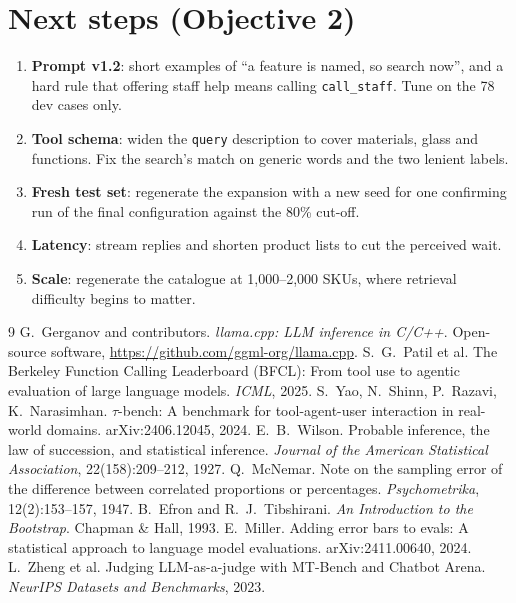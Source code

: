 \documentclass[11pt,a4paper]{article}
\begin{document}
\section{Next steps (Objective 2)}\label{sec:next}
\begin{enumerate}
  \item \textbf{Prompt v1.2}: short examples of ``a feature is named, so search now'', and a hard rule that offering
        staff help means calling \texttt{call\_staff}. Tune on the 78 dev cases only.
  \item \textbf{Tool schema}: widen the \texttt{query} description to cover materials, glass and functions. Fix the
        search's match on generic words and the two lenient labels.
  \item \textbf{Fresh test set}: regenerate the expansion with a new seed for one confirming run of the final
        configuration against the 80\% cut-off.
  \item \textbf{Latency}: stream replies and shorten product lists to cut the perceived wait.
  \item \textbf{Scale}: regenerate the catalogue at 1,000--2,000 SKUs, where retrieval difficulty begins to matter.
\end{enumerate}

\begin{thebibliography}{9}
 G.~Gerganov and contributors. \emph{llama.cpp: LLM inference in C/C++}. Open-source software,
  \url{https://github.com/ggml-org/llama.cpp}.
 S.~G.~Patil et al. The Berkeley Function Calling Leaderboard (BFCL): From tool use to agentic evaluation of
  large language models. \emph{ICML}, 2025.
 S.~Yao, N.~Shinn, P.~Razavi, K.~Narasimhan. $\tau$-bench: A benchmark for tool-agent-user interaction
  in real-world domains. arXiv:2406.12045, 2024.
 E.~B.~Wilson. Probable inference, the law of succession, and statistical inference. \emph{Journal of
  the American Statistical Association}, 22(158):209--212, 1927.
 Q.~McNemar. Note on the sampling error of the difference between correlated proportions or
  percentages. \emph{Psychometrika}, 12(2):153--157, 1947.
 B.~Efron and R.~J.~Tibshirani. \emph{An Introduction to the Bootstrap}. Chapman \& Hall, 1993.
 E.~Miller. Adding error bars to evals: A statistical approach to language model evaluations.
  arXiv:2411.00640, 2024.
 L.~Zheng et al. Judging LLM-as-a-judge with MT-Bench and Chatbot Arena. \emph{NeurIPS Datasets and
  Benchmarks}, 2023.
\end{thebibliography}
\end{document}
